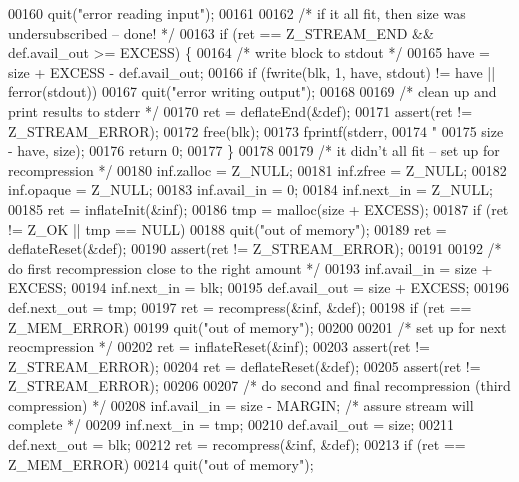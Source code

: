 \begin{DoxyCode}
{00160         quit(\textcolor{stringliteral}{"error reading input"});
00161 
00162     \textcolor{comment}{/* if it all fit, then size was undersubscribed -- done! */}
00163     \textcolor{keywordflow}{if} (ret == Z\_STREAM\_END && def.avail\_out >= EXCESS) \{
00164         \textcolor{comment}{/* write block to stdout */}
00165         have = size + EXCESS - def.avail\_out;
00166         \textcolor{keywordflow}{if} (fwrite(blk, 1, have, stdout) != have || ferror(stdout))
00167             quit(\textcolor{stringliteral}{"error writing output"});
00168 
00169         \textcolor{comment}{/* clean up and print results to stderr */}
00170         ret = deflateEnd(&def);
00171         assert(ret != Z\_STREAM\_ERROR);
00172         free(blk);
00173         fprintf(stderr,
00174                 \textcolor{stringliteral}{"%
00175                 size - have, size);
00176         \textcolor{keywordflow}{return} 0;
00177     \}
00178 
00179     \textcolor{comment}{/* it didn't all fit -- set up for recompression */}
00180     inf.zalloc = Z\_NULL;
00181     inf.zfree = Z\_NULL;
00182     inf.opaque = Z\_NULL;
00183     inf.avail\_in = 0;
00184     inf.next\_in = Z\_NULL;
00185     ret = inflateInit(&inf);
00186     tmp = malloc(size + EXCESS);
00187     \textcolor{keywordflow}{if} (ret != Z\_OK || tmp == NULL)
00188         quit(\textcolor{stringliteral}{"out of memory"});
00189     ret = deflateReset(&def);
00190     assert(ret != Z\_STREAM\_ERROR);
00191 
00192     \textcolor{comment}{/* do first recompression close to the right amount */}
00193     inf.avail\_in = size + EXCESS;
00194     inf.next\_in = blk;
00195     def.avail\_out = size + EXCESS;
00196     def.next\_out = tmp;
00197     ret = recompress(&inf, &def);
00198     \textcolor{keywordflow}{if} (ret == Z\_MEM\_ERROR)
00199         quit(\textcolor{stringliteral}{"out of memory"});
00200 
00201     \textcolor{comment}{/* set up for next reocmpression */}
00202     ret = inflateReset(&inf);
00203     assert(ret != Z\_STREAM\_ERROR);
00204     ret = deflateReset(&def);
00205     assert(ret != Z\_STREAM\_ERROR);
00206 
00207     \textcolor{comment}{/* do second and final recompression (third compression) */}
00208     inf.avail\_in = size - MARGIN;   \textcolor{comment}{/* assure stream will complete */}
00209     inf.next\_in = tmp;
00210     def.avail\_out = size;
00211     def.next\_out = blk;
00212     ret = recompress(&inf, &def);
00213     \textcolor{keywordflow}{if} (ret == Z\_MEM\_ERROR)
00214         quit(\textcolor{stringliteral}{"out of memory"});
}}
\end{DoxyCode}
